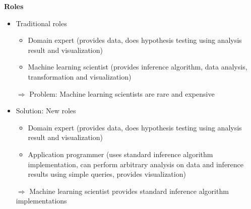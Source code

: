 \textbf{Roles}
\begin{itemize}
\item Traditional roles
	\begin{itemize}
	\item Domain expert (provides data, does hypothesis testing using analysis result and visualization)
	\item Machine learning scientist (provides inference algorithm, data analysis, transformation and visualization)
	\end{itemize}
	$\Rightarrow$ Problem: Machine learning scientists are rare and expensive
\item Solution: New roles
	\begin{itemize}
	\item Domain expert (provides data, does hypothesis testing using analysis result and visualization)
	\item Application programmer (uses standard inference algorithm implementation, can perform arbitrary analysis on data and inference results using simple queries, provides visualization)
	\end{itemize}
	$\Rightarrow$ Machine learning scientist provides standard inference algorithm implementations
\end{itemize}

